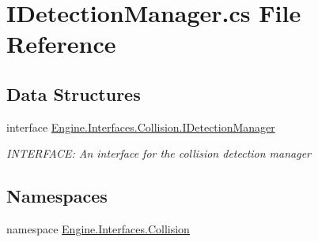 \hypertarget{a00104}{}\section{I\+Detection\+Manager.\+cs File Reference}
\label{a00104}
\subsection*{Data Structures}
\begin{DoxyCompactItemize}
\item 
interface \hyperlink{a00430}{Engine.\+Interfaces.\+Collision.\+I\+Detection\+Manager}
\begin{DoxyCompactList}\small\item\em I\+N\+T\+E\+R\+F\+A\+CE\+: An interface for the collision detection manager \end{DoxyCompactList}\end{DoxyCompactItemize}
\subsection*{Namespaces}
\begin{DoxyCompactItemize}
\item 
namespace \hyperlink{a00255}{Engine.\+Interfaces.\+Collision}
\end{DoxyCompactItemize}
